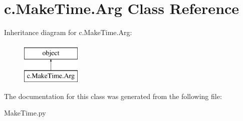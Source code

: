 \hypertarget{classc_1_1_make_time_1_1_arg}{}\section{c.\+Make\+Time.\+Arg Class Reference}
\label{classc_1_1_make_time_1_1_arg}
Inheritance diagram for c.\+Make\+Time.\+Arg\+:\begin{figure}[H]
\begin{center}
\leavevmode
\includegraphics[height=2.000000cm]{classc_1_1_make_time_1_1_arg}
\end{center}
\end{figure}


The documentation for this class was generated from the following file\+:\begin{DoxyCompactItemize}
\item 
Make\+Time.\+py\end{DoxyCompactItemize}
